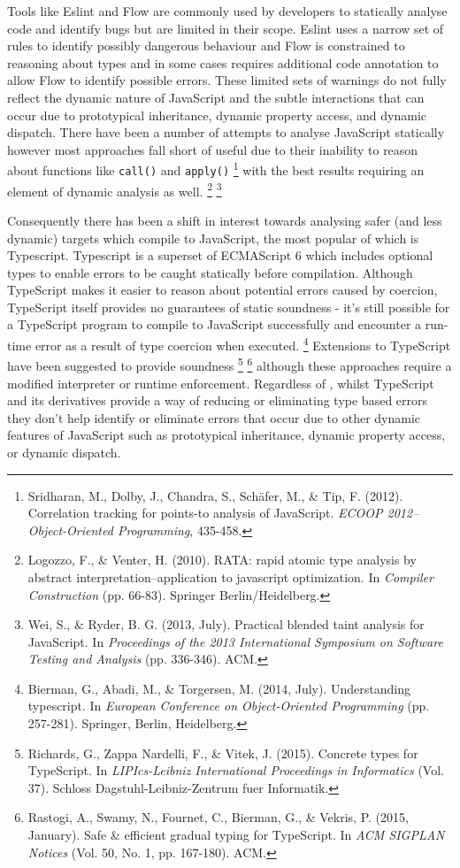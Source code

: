\documentclass[]{article}
\begin{document}
Tools like Eslint and Flow are commonly used by developers to statically
analyse code and identify bugs but are limited in their scope. Eslint
uses a narrow set of rules to identify possibly dangerous behaviour and
Flow is constrained to reasoning about types and in some cases requires
additional code annotation to allow Flow to identify possible errors.
These limited sets of warnings do not fully reflect the dynamic nature
of JavaScript and the subtle interactions that can occur due to
prototypical inheritance, dynamic property access, and dynamic dispatch.
There have been a number of attempts to analyse JavaScript statically
however most approaches fall short of useful due to their inability to
reason about functions like \texttt{call()} and \texttt{apply()}
\footnote{Sridharan, M., Dolby, J., Chandra, S., Schäfer, M., \& Tip, F.
  (2012). Correlation tracking for points-to analysis of JavaScript.
  \emph{ECOOP 2012--Object-Oriented Programming}, 435-458.} with the
best results requiring an element of dynamic analysis as well.
\footnote{Logozzo, F., \& Venter, H. (2010). RATA: rapid atomic type
  analysis by abstract interpretation--application to javascript
  optimization. In \emph{Compiler Construction} (pp. 66-83). Springer
  Berlin/Heidelberg.} \footnote{Wei, S., \& Ryder, B. G. (2013, July).
  Practical blended taint analysis for JavaScript. In \emph{Proceedings
  of the 2013 International Symposium on Software Testing and Analysis}
  (pp. 336-346). ACM.}

Consequently there has been a shift in interest towards analysing safer
(and less dynamic) targets which compile to JavaScript, the most popular
of which is Typescript. Typescript is a superset of ECMAScript 6 which
includes optional types to enable errors to be caught statically before
compilation. Although TypeScript makes it easier to reason about
potential errors caused by coercion, TypeScript itself provides no
guarantees of static soundness - it's still possible for a TypeScript
program to compile to JavaScript successfully and encounter a run-time
error as a result of type coercion when executed. \footnote{Bierman, G.,
  Abadi, M., \& Torgersen, M. (2014, July). Understanding typescript. In
  \emph{European Conference on Object-Oriented Programming} (pp.
  257-281). Springer, Berlin, Heidelberg.} Extensions to TypeScript have
been suggested to provide soundness \footnote{Richards, G., Zappa
  Nardelli, F., \& Vitek, J. (2015). Concrete types for TypeScript. In
  \emph{LIPIcs-Leibniz International Proceedings in Informatics} (Vol.
  37). Schloss Dagstuhl-Leibniz-Zentrum fuer Informatik.} \footnote{Rastogi,
  A., Swamy, N., Fournet, C., Bierman, G., \& Vekris, P. (2015,
  January). Safe \& efficient gradual typing for TypeScript. In
  \emph{ACM SIGPLAN Notices} (Vol. 50, No. 1, pp. 167-180). ACM.}
although these approaches require a modified interpreter or runtime
enforcement. Regardless of , whilst TypeScript and its derivatives
provide a way of reducing or eliminating type based errors they don't
help identify or eliminate errors that occur due to other dynamic
features of JavaScript such as prototypical inheritance, dynamic
property access, or dynamic dispatch.
\end{document}
